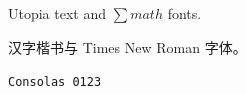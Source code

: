 \documentclass[UTF8]{ctexart}
\begin{document}
Utopia text and $\sum math$ fonts.

汉字楷书与 {\timesn Times New Roman} 字体。

\texttt{Consolas 0123}
\end{document}
